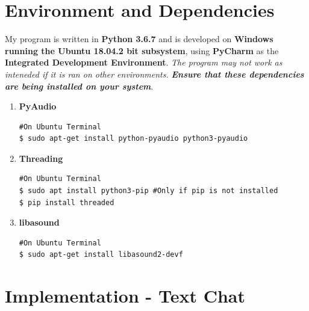\documentclass[a4paper,11pt]{article}
\begin{document}
\section{Environment and Dependencies}
My program is written in \textbf{Python 3.6.7} and is developed on \textbf{Windows running the Ubuntu 18.04.2 bit subsystem}, using \textbf{PyCharm} as the \textbf{Integrated Development Environment}. \textit{The program may not work as inteneded if it is ran on other environments.}
\textit{\textbf{Ensure that these dependencies are being installed on your system}}.
\begin{enumerate}
  \item \textbf{PyAudio}
\begin{mdframed}[backgroundcolor=light-gray, roundcorner=30pt,leftmargin=1, rightmargin=1, innerleftmargin=5, innertopmargin=-3,innerbottommargin=5, outerlinewidth=1, linecolor=light-gray]
\begin{lstlisting}
#On Ubuntu Terminal
$ sudo apt-get install python-pyaudio python3-pyaudio
\end{lstlisting}
\end{mdframed}
  \item \textbf{Threading}
\begin{mdframed}[backgroundcolor=light-gray, roundcorner=30pt,leftmargin=1, rightmargin=1, innerleftmargin=5, innertopmargin=-3,innerbottommargin=5, outerlinewidth=1, linecolor=light-gray]
\begin{lstlisting}
#On Ubuntu Terminal
$ sudo apt install python3-pip #Only if pip is not installed
$ pip install threaded
\end{lstlisting}
\end{mdframed}
  \item \textbf{libasound}
\begin{mdframed}[backgroundcolor=light-gray, roundcorner=30pt,leftmargin=1, rightmargin=1, innerleftmargin=5, innertopmargin=-3,innerbottommargin=5, outerlinewidth=1, linecolor=light-gray]
\begin{lstlisting}
#On Ubuntu Terminal
$ sudo apt-get install libasound2-devf
\end{lstlisting}
\end{mdframed}
\end{enumerate}

\section{Implementation - Text Chat}
\end{document}

